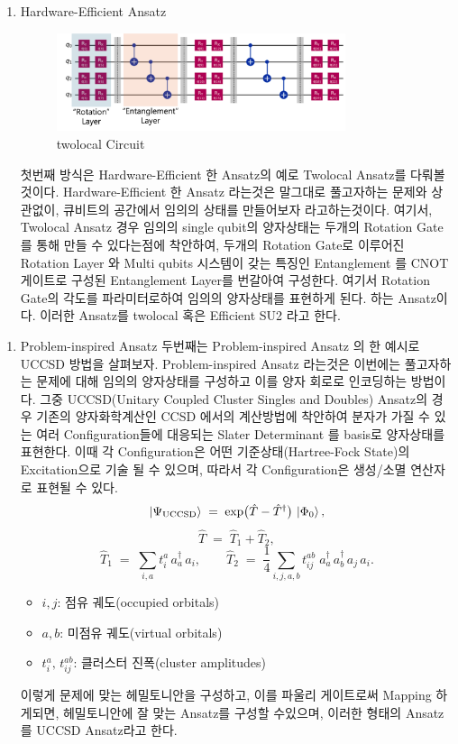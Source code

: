\documentclass[10pt]{article}
\begin{document}
\begin{enumerate}[label=\(1\))]
\item {Hardware-Efficient Ansatz}
\begin{figure}[H]
  \centering
  \includegraphics[width=0.8\textwidth]{fig/twolocal.png}
  \caption{twolocal Circuit}
  \label{fig:example3}
\end{figure}
첫번째 방식은 Hardware-Efficient 한 Ansatz의 예로 Twolocal Ansatz를 다뤄볼것이다. 
Hardware-Efficient 한 Ansatz 라는것은 말그대로 풀고자하는 문제와 상관없이, 큐비트의 공간에서 임의의 상태를 만들어보자 라고하는것이다. 
여기서, Twolocal Ansatz 경우 임의의 single qubit의 양자상태는 두개의 Rotation Gate를 통해 만들 수 있다는점에 착안하여, 
두개의 Rotation Gate로 이루어진 Rotation Layer 와 Multi qubits 시스템이 갖는 특징인 Entanglement 를 CNOT 게이트로 구성된 Entanglement Layer를 번갈아여 구성한다. 
여기서  Rotation Gate의 각도를 파라미터로하여 임의의 양자상태를 표현하게 된다. 하는 Ansatz이다. 이러한 Ansatz를 twolocal 혹은 Efficient SU2 라고 한다. 
\end{enumerate}

\begin{enumerate}[label=\(2\))]
\item {Problem-inspired Ansatz}
두번째는 Problem-inspired Ansatz 의 한 예시로 UCCSD 방법을 살펴보자.
Problem-inspired Ansatz 라는것은 이번에는 풀고자하는 문제에 대해 임의의 양자상태를 구성하고 이를 양자 회로로 인코딩하는 방법이다. 
그중 UCCSD(Unitary Coupled Cluster Singles and Doubles) Ansatz의 경우 기존의 양자화학계산인 CCSD 에서의 계산방법에 착안하여
분자가 가질 수 있는 여러 Configuration들에 대응되는 Slater Determinant 를 basis로 양자상태를 표현한다. 
이때 각 Configuration은 어떤 기준상태(Hartree-Fock State)의 Excitation으로 기술 될 수 있으며, 따라서 각 Configuration은 생성/소멸 연산자로 표현될 수 있다. 
\[
\ket{\Psi_{\mathrm{UCCSD}}}
   \;=\;
   \exp\bigl(\hat{T} - \hat{T}^\dagger\bigr)\,\ket{\Phi_0},
\]
\[
\hat{T} \;=\; \hat{T}_1 + \hat{T}_2,
\]
\[
\hat{T}_1 \;=\; \sum_{i,a} t_i^a \,a_a^\dagger\,a_i,
\qquad
\hat{T}_2 \;=\; \frac{1}{4}\sum_{i,j,a,b} t_{ij}^{ab}\;a_a^\dagger\,a_b^\dagger\,a_j\,a_i.
\]

\begin{itemize}
  \item \(i,j\): 점유 궤도(occupied orbitals)
  \item \(a,b\): 미점유 궤도(virtual orbitals)
  \item \(t_i^a,\,t_{ij}^{ab}\): 클러스터 진폭(cluster amplitudes)
\end{itemize}
이렇게 문제에 맞는 헤밀토니안을 구성하고, 이를 파울리 게이트로써 Mapping 하게되면, 헤밀토니안에 잘 맞는 Ansatz를 구성할 수있으며, 이러한 형태의 Ansatz를 UCCSD Ansatz라고 한다. 
\end{enumerate}
\end{document}
